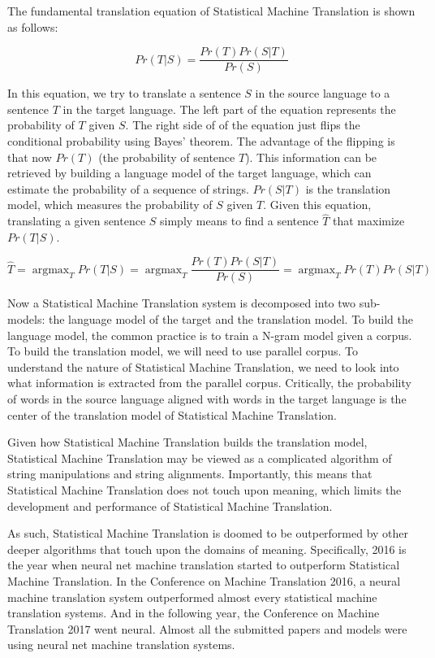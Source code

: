 \documentclass[final]{ua-thesis}
\numberwithin{equation}{section}
\DeclareMathOperator*{\argmax}{argmax}
\begin{document}
The fundamental translation equation of Statistical Machine Translation is shown as follows:

\begin{equation}
Pr(T|S)=\frac{Pr(T)Pr(S|T)}{Pr(S)}
\end{equation}

In this equation, we try to translate a sentence $S$ in the source language to a sentence $T$ in the target language. The left part of the equation represents the probability of $T$ given $S$. 
The right side of of the equation just flips the conditional probability using Bayes' theorem. 
The advantage of the flipping is that now $Pr(T)$ (the probability of sentence $T$). 
This information can be retrieved by building a language model of the target language, which can estimate the probability of a sequence of strings. $Pr(S|T)$ is the translation model, which measures the probability of $S$ given $T$. 
Given this equation, translating a given sentence $S$ simply means to find a sentence $\hat{T}$ that maximize $Pr(T|S)$.   

\begin{equation}
\hat{T}= \argmax_{T} Pr(T|S) = \argmax_{T} \frac{Pr(T)Pr(S|T)}{Pr(S)} = \argmax_{T} Pr(T)Pr(S|T)
\end{equation}

Now a Statistical Machine Translation system is decomposed into two sub-models: the language model of the target and the translation model. 
To build the language model, the common practice is to train a N-gram model given a corpus. 
To build the translation model, we will need to use parallel corpus. 
To understand the nature of Statistical Machine Translation, we need to look into what information is extracted from the parallel corpus. Critically, the probability of words in the source language aligned with words in the target language is the center of the translation model of Statistical Machine Translation. 

Given how Statistical Machine Translation builds the translation model, Statistical Machine Translation may be viewed as a complicated algorithm of string manipulations and string alignments. 
Importantly, this means that Statistical Machine Translation does not touch upon meaning, which limits the development and performance of Statistical Machine Translation. 

As such, Statistical Machine Translation is doomed to be outperformed by other deeper algorithms that touch upon the domains of meaning. Specifically, 2016 is the year when neural net machine translation started to outperform Statistical Machine Translation. In the Conference on Machine Translation 2016, a neural machine translation system outperformed almost every statistical machine translation systems. And in the following year, the Conference on Machine Translation 2017 went neural. Almost all the submitted papers and models were using neural net machine translation systems. 
\end{document}
